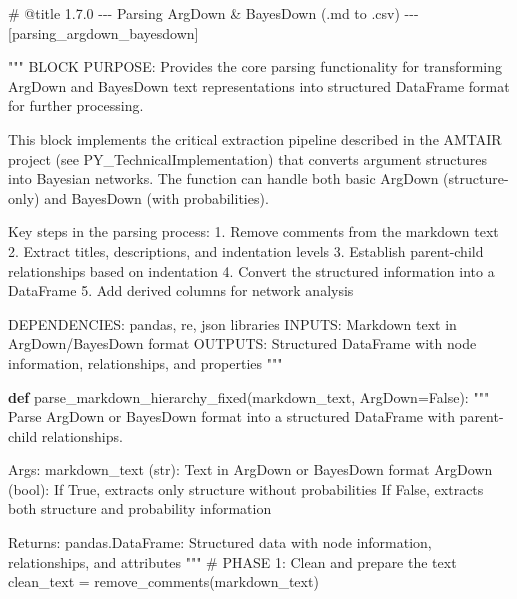 \documentclass[
  11pt,
  letterpaper,
]{book}
\newenvironment{Shaded}{\begin{snugshade}}{\end{snugshade}}
\newcommand{\CommentTok}[1]{\textcolor[rgb]{0.37,0.37,0.37}{#1}}
\newcommand{\KeywordTok}[1]{\textcolor[rgb]{0.00,0.23,0.31}{\textbf{#1}}}
\newcommand{\NormalTok}[1]{\textcolor[rgb]{0.00,0.23,0.31}{#1}}
\newcommand{\OperatorTok}[1]{\textcolor[rgb]{0.37,0.37,0.37}{#1}}
\newcommand{\VariableTok}[1]{\textcolor[rgb]{0.07,0.07,0.07}{#1}}
\begin{document}
\label{parsing_argdown_bayesdown}
\begin{Shaded}
\begin{Highlighting}[]
\CommentTok{\# @title 1.7.0 {-}{-}{-} Parsing ArgDown \& BayesDown (.md to .csv) {-}{-}{-} [parsing\_argdown\_bayesdown]}

\CommentTok{"""}
\CommentTok{BLOCK PURPOSE: Provides the core parsing functionality for transforming ArgDown}
\CommentTok{and BayesDown text representations into structured DataFrame format for further}
\CommentTok{processing.}

\CommentTok{This block implements the critical extraction pipeline described in the AMTAIR}
\CommentTok{project (see PY\_TechnicalImplementation) that converts argument structures}
\CommentTok{into Bayesian networks.}
\CommentTok{The function can handle both basic ArgDown (structure{-}only) and}
\CommentTok{BayesDown (with probabilities).}

\CommentTok{Key steps in the parsing process:}
\CommentTok{1. Remove comments from the markdown text}
\CommentTok{2. Extract titles, descriptions, and indentation levels}
\CommentTok{3. Establish parent{-}child relationships based on indentation}
\CommentTok{4. Convert the structured information into a DataFrame}
\CommentTok{5. Add derived columns for network analysis}

\CommentTok{DEPENDENCIES: pandas, re, json libraries}
\CommentTok{INPUTS: Markdown text in ArgDown/BayesDown format}
\CommentTok{OUTPUTS: Structured DataFrame with node information, relationships, and properties}
\CommentTok{"""}

\KeywordTok{def}\NormalTok{ parse\_markdown\_hierarchy\_fixed(markdown\_text, ArgDown}\OperatorTok{=}\VariableTok{False}\NormalTok{):}
    \CommentTok{"""}
\CommentTok{    Parse ArgDown or BayesDown format into a structured DataFrame with parent{-}child relationships.}

\CommentTok{    Args:}
\CommentTok{        markdown\_text (str): Text in ArgDown or BayesDown format}
\CommentTok{        ArgDown (bool): If True, extracts only structure without probabilities}
\CommentTok{                        If False, extracts both structure and probability information}

\CommentTok{    Returns:}
\CommentTok{        pandas.DataFrame: Structured data with node information, relationships, and attributes}
\CommentTok{    """}
    \CommentTok{\# PHASE 1: Clean and prepare the text}
\NormalTok{    clean\_text }\OperatorTok{=}\NormalTok{ remove\_comments(markdown\_text)}


\end{Highlighting}
\end{Shaded}
\end{document}
